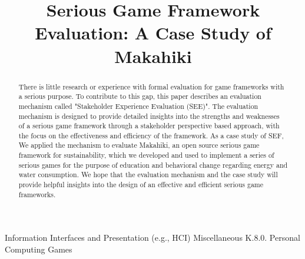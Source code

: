 \documentclass{sigchi}
\begin{document}
\title{Serious Game Framework Evaluation: A Case Study of Makahiki}


\maketitle

\begin{abstract}
There is little research or experience with formal evaluation for game frameworks with a serious purpose. To contribute to this gap, this paper describes an evaluation mechanism called "Stakeholder Experience Evaluation (SEE)". The evaluation mechanism is designed to provide detailed insights into the strengths and weaknesses of a serious game framework through a stakeholder perspective based approach, with the focus on the effectiveness and efficiency of the framework. As a case study of SEF, We applied the mechanism to evaluate Makahiki, an open source serious game framework for sustainability, which we developed and used to implement a series of serious games for the purpose of education and behavioral change regarding energy and water consumption. We hope that the evaluation mechanism and the case study will provide helpful insights into the design of an effective and efficient serious game frameworks.

\end{abstract}


 {Information Interfaces and Presentation (e.g., HCI)} {Miscellaneous}
 {K.8.0.} {Personal Computing} {Games}

\end{document}
